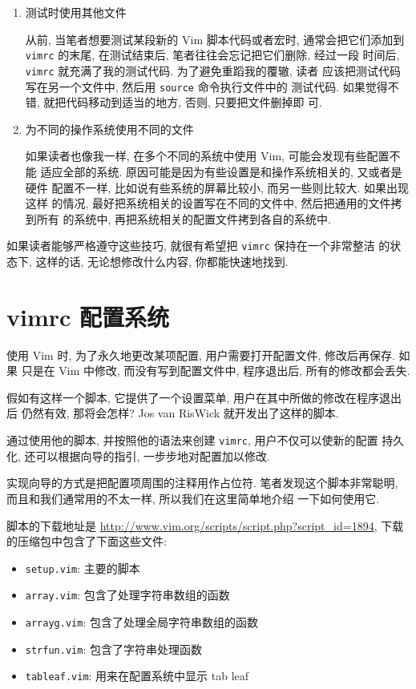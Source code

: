 \begin{enumerate}
    \item 测试时使用其他文件

    从前, 当笔者想要测试某段新的 Vim 脚本代码或者宏时, 通常会把它们添加到
    \texttt{vimrc} 的末尾, 在测试结束后, 笔者往往会忘记把它们删除, 经过一段
    时间后, \texttt{vimrc} 就充满了我的测试代码. 为了避免重蹈我的覆辙, 读者
    应该把测试代码写在另一个文件中, 然后用 \texttt{source} 命令执行文件中的
    测试代码. 如果觉得不错, 就把代码移动到适当的地方, 否则, 只要把文件删掉即
    可.

	\item 为不同的操作系统使用不同的文件

	如果读者也像我一样, 在多个不同的系统中使用 Vim, 可能会发现有些配置不能
	适应全部的系统. 原因可能是因为有些设置是和操作系统相关的, 又或者是硬件
	配置不一样, 比如说有些系统的屏幕比较小, 而另一些则比较大. 如果出现这样
	的情况, 最好把系统相关的设置写在不同的文件中, 然后把通用的文件拷到所有
	的系统中, 再把系统相关的配置文件拷到各自的系统中.
\end{enumerate}

如果读者能够严格遵守这些技巧, 就很有希望把 \texttt{vimrc} 保持在一个非常整洁
的状态下, 这样的话, 无论想修改什么内容, 你都能快速地找到.

\section{vimrc 配置系统}
\label{sec:a_vimrc_setup_system}

使用 Vim 时, 为了永久地更改某项配置, 用户需要打开配置文件, 修改后再保存. 如果
只是在 Vim 中修改, 而没有写到配置文件中, 程序退出后, 所有的修改都会丢失.

假如有这样一个脚本, 它提供了一个设置菜单, 用户在其中所做的修改在程序退出后
仍然有效, 那将会怎样? Jos van RisWick 就开发出了这样的脚本.

通过使用他的脚本, 并按照他的语法来创建 \texttt{vimrc}, 用户不仅可以使新的配置
持久化, 还可以根据向导的指引, 一步步地对配置加以修改.

实现向导的方式是把配置项周围的注释用作占位符.
笔者发现这个脚本非常聪明, 而且和我们通常用的不太一样, 所以我们在这里简单地介绍
一下如何使用它.

脚本的下载地址是 \url{http://www.vim.org/scripts/script.php?script_id=1894},
下载的压缩包中包含了下面这些文件:
\begin{itemize}
  \item \texttt{setup.vim}: 主要的脚本
  \item \texttt{array.vim}: 包含了处理字符串数组的函数
  \item \texttt{arrayg.vim}: 包含了处理全局字符串数组的函数
  \item \texttt{strfun.vim}: 包含了字符串处理函数
  \item \texttt{tableaf.vim}: 用来在配置系统中显示 tab leaf
\end{itemize}

